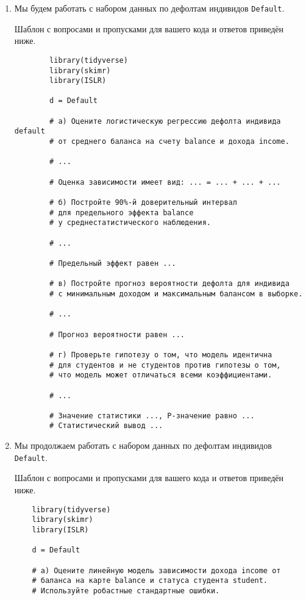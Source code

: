 \documentclass[12pt]{article}
\begin{document}
\begin{enumerate}
\newpage
    \item Мы будем работать с набором данных по дефолтам индивидов \verb|Default|.

    Шаблон с вопросами и пропусками для вашего кода и ответов приведён ниже. 

    \begin{verbatim}
        library(tidyverse)
        library(skimr)
        library(ISLR)

        d = Default

        # а) Оцените логистическую регрессию дефолта индивида default 
        # от среднего баланса на счету balance и дохода income. 

        # ...

        # Оценка зависимости имеет вид: ... = ... + ... + ...  

        # б) Постройте 90%-й доверительный интервал 
        # для предельного эффекта balance 
        # у среднестатистического наблюдения. 

        # ...

        # Предельный эффект равен ...

        # в) Постройте прогноз вероятности дефолта для индивида 
        # с минимальным доходом и максимальным балансом в выборке.

        # ...

        # Прогноз вероятности равен ...

        # г) Проверьте гипотезу о том, что модель идентична 
        # для студентов и не студентов против гипотезы о том,
        # что модель может отличаться всеми коэффициентами. 

        # ...

        # Значение статистики ..., P-значение равно ... 
        # Статистический вывод ...

    \end{verbatim}

    \newpage
    \item Мы продолжаем работать с набором данных по дефолтам индивидов \verb|Default|.

    Шаблон с вопросами и пропусками для вашего кода и ответов приведён ниже. 

\begin{verbatim}
    library(tidyverse)
    library(skimr)
    library(ISLR)

    d = Default

    # а) Оцените линейную модель зависимости дохода income от
    # баланса на карте balance и статуса студента student. 
    # Используйте робастные стандартные ошибки. 


\end{verbatim}
\end{enumerate}
\end{document}
